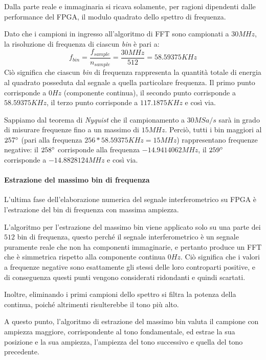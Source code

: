 Dalla parte reale e immaginaria si ricava solamente, per ragioni dipendenti dalle performance del FPGA, il modulo quadrato dello spettro di frequenza.

Dato che i campioni in ingresso all'algoritmo di FFT sono campionati a $30MHz$, la risoluzione di frequenza di ciascun \textit{bin} è pari a:
\begin{equation}
	f_{bin} = \frac{f_{sample}}{n_{sample}} = \frac{30MHz}{512} = 58.59375 KHz
\end{equation}
Ciò significa che ciascun \textit{bin} di frequenza rappresenta la quantità totale di energia al quadrato posseduta dal segnale a quella particolare frequenza. Il primo punto corrisponde a $0Hz$ (componente continua), il secondo punto corrisponde a $58.59375 KHz$, il terzo punto corrisponde a $117.1875KHz$ e così via.

Sappiamo dal teorema di \textit{Nyquist} che il campionamento a $30MSa/s$ sarà in grado di misurare frequenze fino a un massimo di $15MHz$. Perciò, tutti i bin maggiori al $257\degree$ (pari alla frequenza $256 * 58.59375 KHz = 15MHz$) rappresentano frequenze negative: il $258\degree$ corrisponde alla frequenza $-14.9414062 MHz$, il $259\degree$ corrisponde a $-14.8828124 MHz$ e così via.

\paragraph{Estrazione del massimo bin di frequenza}
L'ultima fase dell'elaborazione numerica del segnale interferometrico su FPGA è l'estrazione del bin di frequenza con massima ampiezza.

L'algoritmo per l'estrazione del massimo bin viene applicato solo su una parte dei $512$ bin di frequenza, questo perché il segnale interferometrico è un segnale puramente reale che non ha componenti immaginarie, e pertanto produce un FFT che è simmetrica rispetto alla componente continua $0 Hz$. Ciò significa che i valori a frequenze negative sono esattamente gli stessi delle loro controparti positive, e di conseguenza questi punti vengono considerati ridondanti e quindi scartati.

Inoltre, eliminando i primi campioni dello spettro si filtra la potenza della continua, poiché altrimenti risulterebbe il tono più alto. 

A questo punto, l'algoritmo di estrazione del massimo bin valuta il campione con ampiezza maggiore, corrispondente al tono fondamentale, ed estrae la sua posizione e la sua ampiezza, l'ampiezza del tono successivo e quella del tono precedente.

